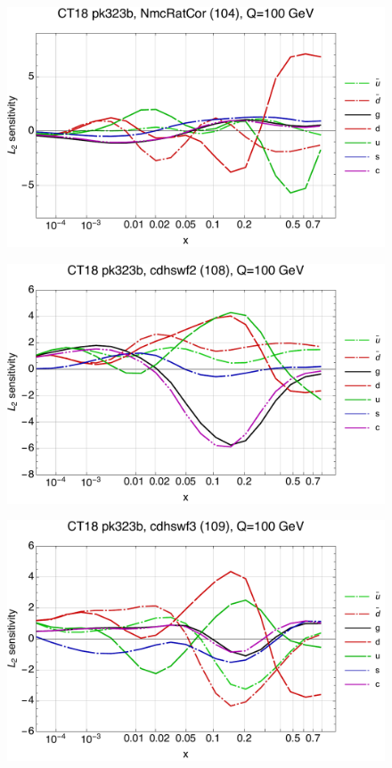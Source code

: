 \documentclass[10pt,aps,prd,floatfix,titlepage]{revtex4}
\begin{document}
\begin{figure}
\includegraphics[width=\textwidth,height=0.44\textheight,keepaspectratio]{1/104_ct18nn_L2_q100_Sf_1.pdf}
\caption{}
\end{figure}
\begin{figure}
\includegraphics[width=\textwidth,height=0.44\textheight,keepaspectratio]{1/108_ct18nn_L2_q100_Sf_1.pdf}
\caption{}
\end{figure}
\clearpage
\begin{figure}
\includegraphics[width=\textwidth,height=0.44\textheight,keepaspectratio]{1/109_ct18nn_L2_q100_Sf_1.pdf}
\caption{}
\end{figure}
\end{document}
